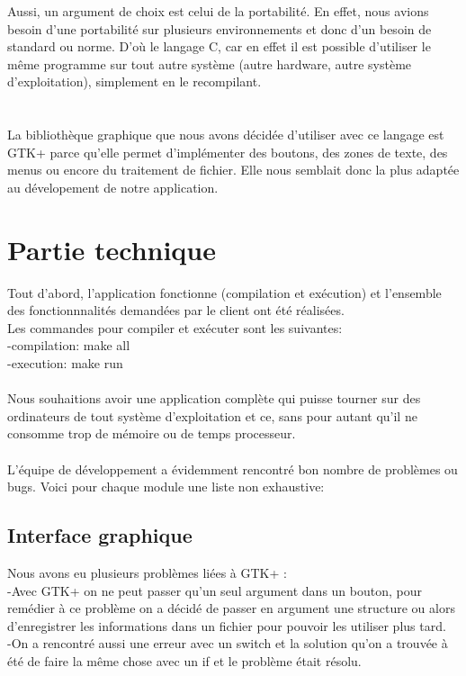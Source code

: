 \documentclass[a4]{article}
\begin{document}
  Aussi, un argument de choix est celui de la portabilité. En effet, nous avions besoin d'une portabilité sur plusieurs
  environnements et donc d'un besoin de standard ou norme. D'où le langage C, car en effet il est possible d'utiliser
  le même programme sur tout autre système (autre hardware, autre système d'exploitation), simplement en le recompilant. \\ \\ \\
  

La bibliothèque graphique que nous avons décidée d'utiliser avec ce langage est GTK+ parce qu'elle permet d'implémenter 
des boutons, des zones de texte, des menus ou encore du traitement de fichier.
Elle nous semblait donc la plus adaptée au dévelopement de notre application.

	\section{Partie technique}
	
	Tout d'abord, l'application fonctionne (compilation et exécution) et
	l'ensemble des fonctionnnalités demandées par le client ont été réalisées.\\ 
	Les commandes pour compiler et exécuter sont les suivantes:\\
	-compilation: make all\\
	-execution: make run\\ \\
	
	
	Nous souhaitions avoir une application complète qui puisse tourner sur des ordinateurs 
de tout système d'exploitation et ce, sans pour autant qu’il ne
consomme trop de mémoire ou de temps processeur. \\ \\
	
	L'équipe de développement a évidemment rencontré bon nombre de problèmes ou bugs. Voici pour chaque
	module une liste non exhaustive:
	\subsection{Interface graphique}
	Nous avons eu plusieurs problèmes liées à GTK+ :\\
	-Avec GTK+ on ne peut passer qu'un seul argument dans un bouton, 
	pour remédier à ce problème on a décidé de passer en argument une structure ou alors d'enregistrer les informations 
  dans un fichier pour pouvoir les utiliser plus tard.\\
	-On a rencontré aussi une erreur avec un switch et la solution qu'on a trouvée à été de faire 
	la même chose avec un if et le problème était résolu.\\
	
\end{document}
